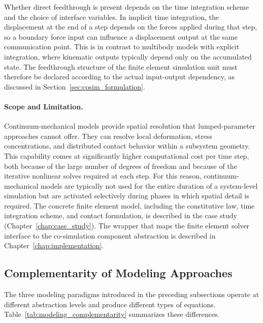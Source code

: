 Whether direct feedthrough is present depends on the time integration scheme and the choice of interface variables.
In implicit time integration, the displacement at the end of a step depends on the forces applied during that step, so a boundary force input can influence a displacement output at the same communication point.
This is in contrast to multibody models with explicit integration, where kinematic outputs typically depend only on the accumulated state.
The feedthrough structure of the finite element simulation unit must therefore be declared according to the actual input-output dependency, as discussed in
Section~\ref{sec:cosim_formulation}.

\paragraph{Scope and Limitation.}
Continuum-mechanical models provide spatial resolution that lumped-parameter approaches cannot offer.
They can resolve local deformation, stress concentrations, and distributed contact behavior within a subsystem geometry.
This capability comes at significantly higher computational cost per time step, both because of the large number of degrees of freedom and because of the iterative nonlinear solves required at each step.
For this reason, continuum-mechanical models are typically not used for the entire duration of a system-level simulation but are activated selectively during phases in which spatial detail is required.
The concrete finite element model, including the constitutive law, time integration scheme, and contact formulation, is described in the case study (Chapter~\ref{chap:case_study}).
The wrapper that maps the finite element solver interface to the co-simulation component abstraction is described in Chapter~\ref{chap:implementation}.

\subsection{Complementarity of Modeling Approaches}
\label{sec:modeling_complementarity}

The three modeling paradigms introduced in the preceding subsections operate at different abstraction levels and produce different types of equations.
Table~\ref{tab:modeling_complementarity} summarizes these differences.

